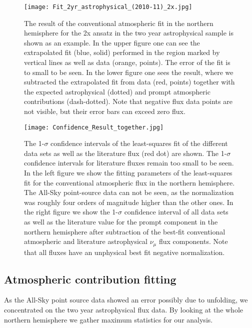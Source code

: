 \documentclass[%
 reprint,
 preprintnumbers,
 nofootinbib,
 amsmath,amssymb,
 aps,
]{revtex4-2}
\begin{document}
\begin{figure}[!h]
	\centering
	\texttt{[image: Fit\_2yr\_astrophysical\_(2010-11)\_2x.jpg]}
	\caption{\label{fig:Fit_2x} The result of the conventional atmospheric fit in the northern hemisphere for the 2x ansatz in the two year astrophysical sample is shown as an example. In the upper figure one can see the extrapolated fit (blue, solid) performed in the region marked by vertical lines as well as data (orange, points). The error of the fit is to small to be seen. In the lower figure one sees the result, where we subtracted the extrapolated fit from data (red, points) together with the expected astrophysical (dotted) and prompt atmospheric contributions (dash-dotted). Note that negative flux data points are not visible, but their error bars can exceed zero flux.}
\end{figure}

\begin{figure*}[!t]
	\texttt{[image: Confidence\_Result\_together.jpg]}
	\caption{\label{fig:result}The 1-$\sigma$ confidence intervals of the least-squares fit of the different data sets as well as the literature flux (red dot) are shown. The 1-$\sigma$ confidence intervals for literature fluxes remain too small to be seen. In the left figure we show the fitting parameters of the least-squares fit for the conventional atmospheric flux in the northern hemisphere. The All-Sky point-source data can not be seen, as the normalization was roughly four orders of magnitude higher than the other ones. In the right figure we show the 1-$\sigma$ confidence interval of all data sets as well as the literature value for the prompt component in the northern hemisphere after subtraction of the best-fit conventional atmospheric and literature astrophysical $\nu_\mu$ flux components. Note that all fluxes have an unphysical best fit negative normalization.}
\end{figure*}

\subsection{Atmospheric contribution fitting}

As the All-Sky point source data showed an error possibly due to unfolding, we concentrated on the two year astrophysical flux data. By looking at the whole northern hemisphere we gather maximum statistics for our analysis.
\end{document}
